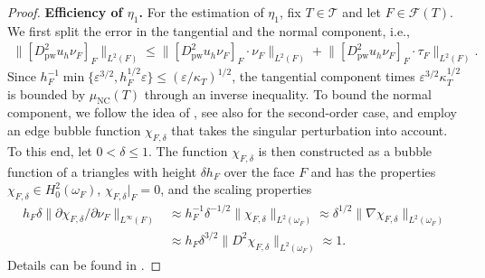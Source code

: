 \documentclass[a4paper]{amsart}
\theoremstyle{definition}
\numberwithin{equation}{section}
\numberwithin{theorem}{section}
\newcommand{\pw}{\mathrm{pw}}
\newcommand{\nc}{\mathrm{NC}}
\newcommand{\tri}{\mathcal{T}}
\begin{document}
\begin{proof}
    \textbf{Efficiency of $\eta_1$.}
    For the estimation of $\eta_1$, fix $T\in\tri$ and 
    let $F\in\mathcal{F}(T)$.
    We first split the error 
    in the tangential and the normal component, i.e., 
    \begin{align*}
        \lVert [D^2_\pw u_h\nu_F]_F\rVert_{L^2(F)}
        \leq \lVert [D^2_\pw u_h\nu_F]_F\cdot\nu_F\rVert_{L^2(F)}
          + \lVert [D^2_\pw u_h\nu_F]_F\cdot\tau_F\rVert_{L^2(F)}.
    \end{align*}
    Since $h_F^{-1}\min\{\varepsilon^{3/2},h_F^{1/2}\varepsilon\}
    \leq (\varepsilon/\kappa_T)^{1/2}$, the tangential component 
    times $\varepsilon^{3/2}\kappa_T^{1/2}$
    is bounded by $\mu_\nc(T)$ through an inverse inequality.
    To bound the normal component, we     
    follow the idea of 
    \cite{GallistlTian2024}, see also \cite{Verfuerth2013} for the 
    second-order case, and 
    employ an edge bubble function $\chi_{F,\delta}$ that takes 
    the singular perturbation into account.
    To this end, let $0<\delta\leq 1$.
    The function $\chi_{F,\delta}$ is then constructed as a bubble 
    function of a triangles with height $\delta h_F$ over the face $F$
    and has the properties 
    $\chi_{F,\delta}\in H^2_0(\omega_F)$,
    $\chi_{F,\delta}\vert_F=0$, 
    and the scaling properties 
    \begin{equation}\label{e:scaling_bubble}
        \begin{aligned}
            h_F\delta\lVert \partial\chi_{F,\delta}/\partial \nu_F\rVert_{L^\infty(F)}
          &\approx h_F^{-1}\delta^{-1/2} \lVert \chi_{F,\delta}\rVert_{L^2(\omega_F)}
          \approx \delta^{1/2} 
             \lVert \nabla \chi_{F,\delta}\rVert_{L^2(\omega_F)}\\
          &\approx h_F\delta^{3/2} 
             \lVert D^2 \chi_{F,\delta}\rVert_{L^2(\omega_F)}
          \approx 1.
        \end{aligned}
    \end{equation}
    Details can be found in \cite{Verfuerth1998,Verfuerth2013,GallistlTian2024}.



\end{proof}
\end{document}
